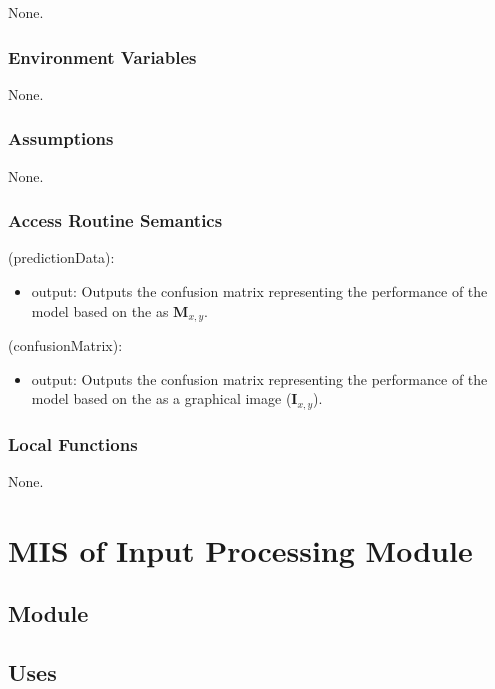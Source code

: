 \documentclass[12pt, titlepage]{article}
\begin{document}
None.

\subsubsection{Environment Variables}

None.

\subsubsection{Assumptions}

None.

\subsubsection{Access Routine Semantics}

\noindent {}(predictionData):
\begin{itemize} 
\item output: Outputs the confusion matrix representing the performance of the model based on the
 as $\mathbf{M}_{x,y}$.
\end{itemize}

\noindent {}(confusionMatrix):
\begin{itemize} 
\item output: Outputs the confusion matrix representing the performance of the model based on the
 as a graphical image ($\mathbf{I}_{x,y}$).
\end{itemize}

\subsubsection{Local Functions}

None.

\section{MIS of Input Processing Module} \label{ModuleIP} 

\subsection{Module}


\subsection{Uses}
\end{document}
